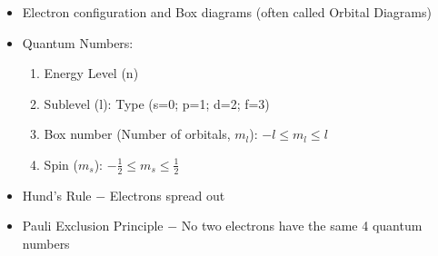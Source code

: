 \documentclass[12pt]{article}
\begin{document}
\begin{itemize}
  \item Electron configuration and Box diagrams (often called Orbital Diagrams)

    \newpage

  \item Quantum Numbers:

    \begin{enumerate}

      \item Energy Level (n)

      \item Sublevel (l): Type (s=0; p=1; d=2; f=3)

      \item Box number (Number of orbitals, $m_l$): $-l\leq m_l\leq l$

      \item Spin ($m_s$): $-\frac{1}{2}\leq m_s\leq \frac{1}{2}$

    \end{enumerate}

  \item Hund's Rule $-$ Electrons spread out

  \item Pauli Exclusion Principle $-$ No two electrons have the same 4 quantum numbers

\end{itemize}
\end{document}
